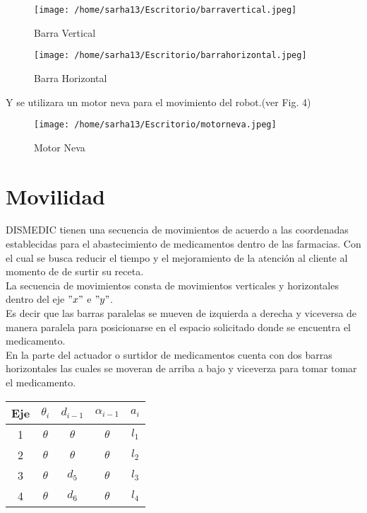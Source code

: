 \documentclass[letter,operight,12pt,spanish]{report}
\begin{document}
\begin{figure}[htp]
\centering
\texttt{[image: /home/sarha13/Escritorio/barravertical.jpeg]}
\caption{Barra Vertical}
\label{Fig. 2}
\end{figure}

\begin{figure}[htp]
\centering
\texttt{[image: /home/sarha13/Escritorio/barrahorizontal.jpeg]}
\caption{Barra Horizontal}
\label{Fig. 3}
\end{figure}

Y se utilizara un motor neva para el movimiento del robot.(ver Fig. 4)\\

\begin{figure}[htp]
\centering
\texttt{[image: /home/sarha13/Escritorio/motorneva.jpeg]}
\caption{Motor Neva}
\label{Fig. 4}
\end{figure}

\section{Movilidad}

DISMEDIC tienen una secuencia de movimientos de acuerdo a las coordenadas establecidas para el abastecimiento de medicamentos dentro de las farmacias. Con el cual se busca reducir el tiempo y el mejoramiento de la atenci\'on al cliente al momento de de surtir su receta.\\
La secuencia de movimientos consta de movimientos verticales y horizontales dentro del eje $"x"$ e $"y"$.\\
Es decir que las barras paralelas se mueven de izquierda a derecha y viceversa de manera paralela para posicionarse en el espacio solicitado donde se encuentra el medicamento.\\
En la parte del actuador o surtidor de medicamentos cuenta con dos barras horizontales las cuales se moveran de arriba a bajo y viceverza para tomar tomar el medicamento.\\

\begin{center}
\begin{tabular}{|c|c|c|c|c|}
\hline
	Eje & $\theta_i$ & $d_{i-1}$ & $\alpha_{i-1}$ & $a_i$\\
\hline
	1 & $\theta$ & $\theta$ & $\theta$ & $l_1$\\
\hline
	2 & $\theta$ & $\theta$ & $\theta$ & $l_2$\\
\hline
	3 & $\theta$ & $d_5$ & $\theta$ & $l_3$\\
\hline
	4 & $\theta$ & $d_6$ & $\theta$ & $l_4$\\
\hline
\end{tabular}
\end{center}
\end{document}
